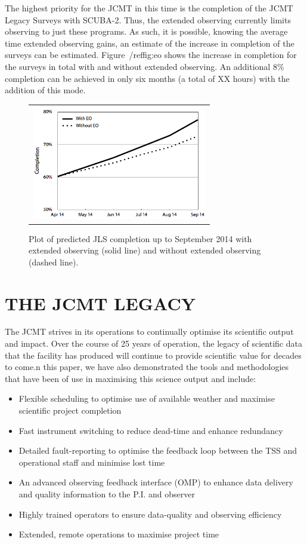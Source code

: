 \documentclass[]{spie}  %
\begin{document}
The highest priority for the JCMT in this time is the completion of
the JCMT Legacy Surveys with SCUBA-2. Thus, the extended observing
currently limits observing to just these programs. As such, it is
possible, knowing the average time extended observing gains, an
estimate of the increase in completion of the surveys can be
estimated. Figure~/ref{fig:eo} shows the increase in completion for
the surveys in total with and without extended observing. An
additional 8$\%$ completion can be achieved in only six months (a
total of XX hours) with the addition of this mode.

\begin{figure}[ht]
   \begin{center}
   \begin{tabular}{c}
   \includegraphics[height=5cm]{JLScompletion-SPIE.png}
   \end{tabular}
   \end{center}
   \caption{\label{fig:eo} Plot of predicted JLS completion up to September 2014 with extended observing (solid line) and without extended observing (dashed line).}
\end{figure}


\section{THE JCMT LEGACY}

The JCMT strives in its operations to continually optimise its
scientific output and impact. Over the course of 25 years of
operation, the legacy of scientific data that the facility has
produced will continue to provide scientific value for decades to
come.n this paper, we have also demonstrated the tools and
methodologies that have been of use in maximising this science output
and include:
\begin{itemize}
\item Flexible scheduling to optimise use of available weather and
  maximise scientific project completion
\item Fast instrument switching to reduce dead-time and enhance
  redundancy
\item Detailed fault-reporting to optimise the feedback loop between
  the TSS and operational staff and minimise lost time
\item An advanced observing feedback interface (OMP) to enhance data
  delivery and quality information to the P.I. and observer
\item Highly trained operators to ensure data-quality and observing
  efficiency
\item Extended, remote operations to maximise project time
\end{itemize}
\end{document}

